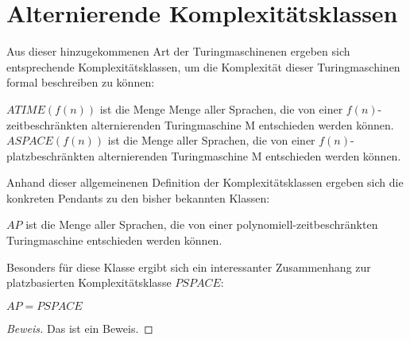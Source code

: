 \section{Alternierende Komplexitätsklassen} \label{section: Komplexitätsklassen bei alternierenden TMs}
Aus dieser hinzugekommenen Art der Turingmaschinenen ergeben sich entsprechende Komplexitätsklassen,
um die Komplexität dieser Turingmaschinen formal beschreiben zu können:
\begin{definition}
    $ATIME(f(n))$ ist die Menge Menge aller Sprachen, die von einer $f(n)$-zeitbeschränkten alternierenden Turingmaschine M entschieden werden können. \\
    $ASPACE(f(n))$ ist die Menge aller Sprachen, die von einer $f(n)$-platzbeschränkten alternierenden Turingmaschine M entschieden werden können.
\end{definition}
Anhand dieser allgemeinenen Definition der Komplexitätsklassen ergeben sich die konkreten Pendants zu den bisher bekannten Klassen:
\begin{definition}
    $AP$ ist die Menge aller Sprachen, die von einer polynomiell-zeitbeschränkten Turingmaschine entschieden werden können.
\end{definition}
Besonders für diese Klasse ergibt sich ein interessanter Zusammenhang zur platzbasierten Komplexitätsklasse $PSPACE$:

\begin{theorem}
    $AP = PSPACE$
\end{theorem}

\begin{proof}[Beweis]
    Das ist ein Beweis.
\end{proof}